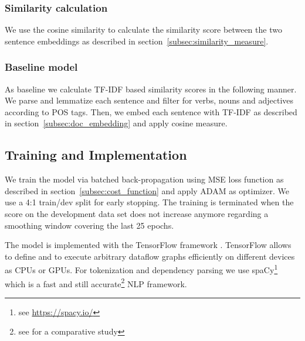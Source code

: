 \subsubsection{Similarity calculation}
We use the cosine similarity to calculate the similarity score between the two sentence embeddings as described in section~\ref{subsec:similarity_measure}.

\subsubsection{Baseline model}
As baseline we calculate TF-IDF based similarity scores in the following manner. We parse and lemmatize each sentence and filter for verbs, nouns and adjectives according to POS tags. Then, we embed each sentence with TF-IDF as described in section~\ref{subsec:doc_embedding} and apply cosine measure. 

\subsection{Training and Implementation}
\label{subesec:training_implementation}
We train the model via batched back-propagation using \ac{MSE} loss function as described in section~\ref{subsec:cost_function} and apply ADAM \autocite{kingma_adam_2014} %
as optimizer. We use a 4:1 train/dev split for early stopping. The training is terminated when the score on the development data set does not increase anymore regarding a smoothing window covering the last 25 epochs. 

The model is implemented with the TensorFlow framework  \autocite{abadi_tensorflow_2016}. TensorFlow allows to define and to execute arbitrary dataflow graphs efficiently on different devices as CPUs or GPUs. For tokenization and dependency parsing we use spaCy\footnote{see \url{https://spacy.io/}} which is a fast and still accurate\footnote{see \textcite{choi_it_2015} for a comparative study} \ac{NLP} framework. 






